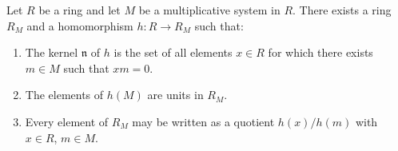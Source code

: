 Let $R$ be a ring and let $M$ be a multiplicative system in $R$. There exists a ring $R_M$ and a homomorphism $h: R \to R_M$ such that:

\begin{enumerate}
\item The kernel $\mathfrak{n}$ of $h$ is the set of all elements $x \in R$ for which there exists $m \in M$ such that $xm = 0$.
\item The elements of $h(M)$ are units in $R_M$.
\item Every element of $R_M$ may be written as a quotient $h(x)/h(m)$ with $x \in R$, $m \in M$.
\end{enumerate}
